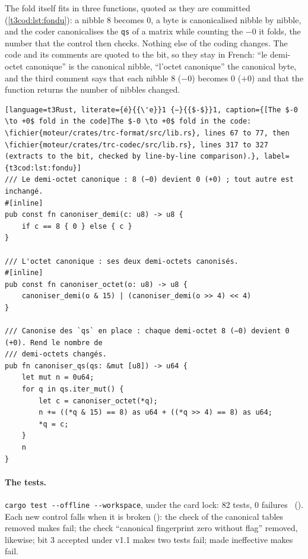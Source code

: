 The fold itself fits in three functions, quoted as they are committed (\cref{t3cod:lst:fondu}): a nibble 8 becomes 0, a byte is canonicalised nibble by nibble, and the coder canonicalises the \texttt{qs} of a matrix while counting the $-0$ it folds, the number that the control then checks. Nothing else of the coding changes. The code and its comments are quoted to the bit, so they stay in French: ``le demi-octet canonique'' is the canonical nibble, ``l'octet canonique'' the canonical byte, and the third comment says that each nibble 8 ($-0$) becomes 0 ($+0$) and that the function returns the number of nibbles changed.

\begin{lstlisting}[language=t3Rust, literate={é}{{\'e}}1 {−}{{$-$}}1, caption={[The $-0 \to +0$ fold in the code]The $-0 \to +0$ fold in the code: \fichier{moteur/crates/trc-format/src/lib.rs}, lines 67 to 77, then \fichier{moteur/crates/trc-codec/src/lib.rs}, lines 317 to 327 (extracts to the bit, checked by line-by-line comparison).}, label={t3cod:lst:fondu}]
/// Le demi-octet canonique : 8 (−0) devient 0 (+0) ; tout autre est inchangé.
#[inline]
pub const fn canoniser_demi(c: u8) -> u8 {
    if c == 8 { 0 } else { c }
}

/// L'octet canonique : ses deux demi-octets canonisés.
#[inline]
pub const fn canoniser_octet(o: u8) -> u8 {
    canoniser_demi(o & 15) | (canoniser_demi(o >> 4) << 4)
}

/// Canonise des `qs` en place : chaque demi-octet 8 (−0) devient 0 (+0). Rend le nombre de
/// demi-octets changés.
pub fn canoniser_qs(qs: &mut [u8]) -> u64 {
    let mut n = 0u64;
    for q in qs.iter_mut() {
        let c = canoniser_octet(*q);
        n += ((*q & 15) == 8) as u64 + ((*q >> 4) == 8) as u64;
        *q = c;
    }
    n
}
\end{lstlisting}

\paragraph{The tests.} \texttt{cargo test -{}-offline -{}-workspace}, under the card lock: 82 tests, 0 failures \mes~(). Each new control falls when it is broken (): the check of the canonical tables removed makes  fail; the check ``canonical fingerprint zero without flag'' removed, likewise; bit 3 accepted under v1.1 makes two tests fail;  made ineffective makes  fail.

